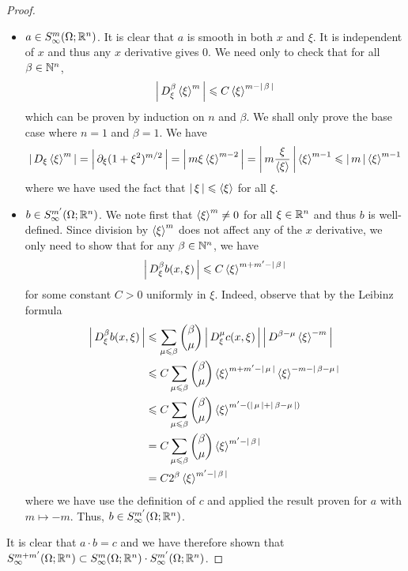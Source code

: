 \documentclass[12pt]{article}
\begin{document}
\begin{proof}
\begin{itemize}
        \item $a \in S^{m}_\infty(\Omega; \R^n)$. It is clear that $a$ is smooth in both $x$ and $\xi$. It is independent of $x$ and thus any $x$ derivative gives 0. We need only to check that for all $\beta \in \N^n$, 
        \[
        \abs{D^\beta_\xi \sym[\xi]^m} \leq C \sym[\xi]^{m - \abs{\beta}}
        \]
        which can be proven by induction on $n$ and $\beta$. We shall only prove the base case where $n = 1$ and $\beta = 1$. We have 
        \begin{align*}
            \abs{D_\xi \sym[\xi]^m} = \abs{\p_\xi (1 + \xi^2)^{m/2}} = \abs{m\xi \sym[\xi]^{m - 2}} = \abs{m \frac{\xi}{\sym[\xi]}} \sym[\xi]^{m - 1} \leq \abs{m} \sym[\xi]^{m - 1}
        \end{align*}
        where we have used the fact that $\abs{\xi} \leq \sym[\xi]$ for all $\xi$. 
        \item $b \in S^{m'}_\infty(\Omega; \R^n)$. We note first that $\sym[\xi]^m \neq 0$ for all $\xi \in \R^n$ and thus $b$ is well-defined. Since division by $\sym[\xi]^m$ does not affect any of the $x$ derivative, we only need to show that for any $\beta \in \N^n$, we have
        \[
        \abs{D^\beta_\xi b(x, \xi)} \leq C \sym[\xi]^{m + m' - \abs{\beta}}
        \]
        for some constant $C > 0$ uniformly in $\xi$. Indeed, observe that by the Leibinz formula
        \begin{align*}
            \abs{D^\beta_\xi b(x, \xi)} 
            & \leq \sum_{\mu \leq \beta} \binom{\beta}{\mu} \abs{D^\mu_\xi c(x, \xi)} \abs{D^{\beta - \mu} \sym[\xi]^{-m}} \\
            & \leq C \sum_{\mu \leq \beta} \binom{\beta}{\mu} \sym[\xi]^{m + m' - \abs{\mu}} \sym[\xi]^{-m - \abs{\beta - \mu}} \\
            & \leq C \sum_{\mu \leq \beta} \binom{\beta}{\mu} \sym[\xi]^{ m' - (\abs{\mu} +  \abs{\beta - \mu})} \\
            & = C \sum_{\mu \leq \beta} \binom{\beta}{\mu} \sym[\xi]^{ m' -\abs{\beta}} \\
            &= C 2^{\beta} \sym[\xi]^{ m' -\abs{\beta}} 
        \end{align*}
        where we have use the definition of $c$ and applied the result proven for $a$ with $m \mapsto -m$. Thus, $b \in S^{m'}_\infty(\Omega; \R^n)$. 
    \end{itemize}
    It is clear that $a \cdot b = c$ and we have therefore shown that $S^{m + m'}_\infty(\Omega; \R^n) \subset S^{m}_\infty(\Omega; \R^n) \cdot S^{m'}_\infty(\Omega; \R^n)$. 
\end{proof}
\end{document}
